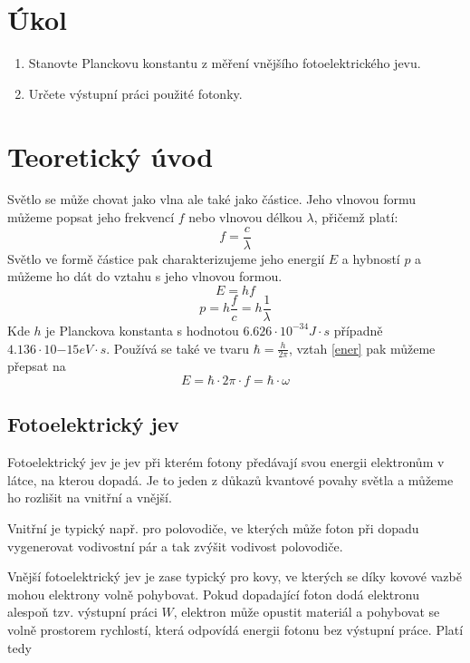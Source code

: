 \documentclass{article}
\begin{document}
\small
\section{Úkol}
\begin{enumerate}
    \item Stanovte Planckovu konstantu z měření vnějšího fotoelektrického jevu.
    \item Určete výstupní práci použité fotonky.
\end{enumerate}

\section{Teoretický úvod}
Světlo se může chovat jako vlna ale také jako částice.
Jeho vlnovou formu můžeme popsat jeho frekvencí \(f\) nebo vlnovou délkou \(\lambda\), přičemž platí:
\begin{equation}
    f=\frac{c}{\lambda}
    \label{frek}
\end{equation}
Světlo ve formě částice pak charakterizujeme jeho energií \(E\) a hybností \(p\) a můžeme ho dát do vztahu s jeho vlnovou formou.
\begin{equation}
    E=hf
    \label{ener}
\end{equation}
\begin{equation}
    p=h\frac{f}{c}=h\frac{1}{\lambda}
    \label{hibn}
\end{equation}
Kde \(h\) je Planckova konstanta s hodnotou \(6.626\cdot10^{-34} J\cdot s\) případně \(4.136\cdot10{-15} eV\cdot s\).
Používá se také ve tvaru \(\hbar=\frac{h}{2\pi}\), vztah \ref{ener} pak můžeme přepsat na
\begin{equation}
    E=\hbar\cdot2\pi\cdot f=\hbar\cdot\omega
    \label{E=2p}
\end{equation}
\subsection{Fotoelektrický jev}
Fotoelektrický jev je jev při kterém fotony předávají svou energii elektronům v látce, na kterou dopadá.
Je to jeden z důkazů kvantové povahy světla a můžeme ho rozlišit na vnitřní a vnější.

Vnitřní je typický např. pro polovodiče, ve kterých může foton při dopadu vygenerovat vodivostní pár a tak zvýšit vodivost polovodiče.

Vnější fotoelektrický jev je zase typický pro kovy, ve kterých se díky kovové vazbě mohou elektrony volně pohybovat.
Pokud dopadající foton dodá elektronu alespoň tzv. výstupní práci \(W\), elektron může opustit materiál a pohybovat se volně prostorem rychlostí, která odpovídá energii fotonu bez výstupní práce.
Platí tedy
\end{document}
